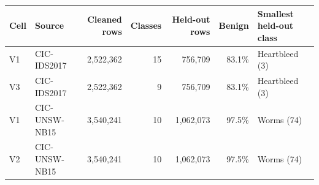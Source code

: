 \begin{tabular}{@{}llrrrrl@{}}
\toprule
Cell & Source & Cleaned rows & Classes & Held-out rows & Benign & Smallest held-out class \\
\midrule
V1 & CIC-IDS2017 & 2,522,362 & 15 & 756,709 & 83.1\% & Heartbleed (3) \\
V3 & CIC-IDS2017 & 2,522,362 & 9 & 756,709 & 83.1\% & Heartbleed (3) \\
V1 & CIC-UNSW-NB15 & 3,540,241 & 10 & 1,062,073 & 97.5\% & Worms (74) \\
V2 & CIC-UNSW-NB15 & 3,540,241 & 10 & 1,062,073 & 97.5\% & Worms (74) \\
\bottomrule
\end{tabular}